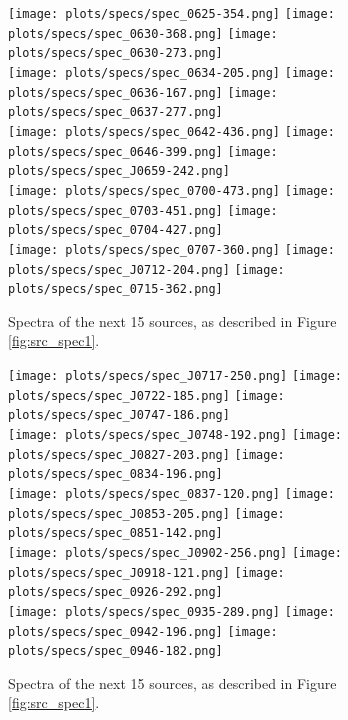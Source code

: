 \documentclass[preprint]{aastex}
\begin{document}
\begin{figure}\centering
\texttt{[image: plots/specs/spec\_0625-354.png]}
\texttt{[image: plots/specs/spec\_0630-368.png]}
\texttt{[image: plots/specs/spec\_0630-273.png]}\\
\texttt{[image: plots/specs/spec\_0634-205.png]}
\texttt{[image: plots/specs/spec\_0636-167.png]}
\texttt{[image: plots/specs/spec\_0637-277.png]}\\
\texttt{[image: plots/specs/spec\_0642-436.png]}
\texttt{[image: plots/specs/spec\_0646-399.png]}
\texttt{[image: plots/specs/spec\_J0659-242.png]}\\
\texttt{[image: plots/specs/spec\_0700-473.png]}
\texttt{[image: plots/specs/spec\_0703-451.png]}
\texttt{[image: plots/specs/spec\_0704-427.png]}\\
\texttt{[image: plots/specs/spec\_0707-360.png]}
\texttt{[image: plots/specs/spec\_J0712-204.png]}
\texttt{[image: plots/specs/spec\_0715-362.png]}\\
\caption{Spectra of the next 15 sources, as described in Figure \ref{fig:src_spec1}.
}\label{fig:src_spec12}
\end{figure}\clearpage

\begin{figure}\centering
\texttt{[image: plots/specs/spec\_J0717-250.png]}
\texttt{[image: plots/specs/spec\_J0722-185.png]}
\texttt{[image: plots/specs/spec\_J0747-186.png]}\\
\texttt{[image: plots/specs/spec\_J0748-192.png]}
\texttt{[image: plots/specs/spec\_J0827-203.png]}
\texttt{[image: plots/specs/spec\_0834-196.png]}\\
\texttt{[image: plots/specs/spec\_0837-120.png]}
\texttt{[image: plots/specs/spec\_J0853-205.png]}
\texttt{[image: plots/specs/spec\_0851-142.png]}\\
\texttt{[image: plots/specs/spec\_J0902-256.png]}
\texttt{[image: plots/specs/spec\_J0918-121.png]}
\texttt{[image: plots/specs/spec\_0926-292.png]}\\
\texttt{[image: plots/specs/spec\_0935-289.png]}
\texttt{[image: plots/specs/spec\_0942-196.png]}
\texttt{[image: plots/specs/spec\_0946-182.png]}\\
\caption{Spectra of the next 15 sources, as described in Figure \ref{fig:src_spec1}.
}\label{fig:src_spec13}
\end{figure}\clearpage
\end{document}

